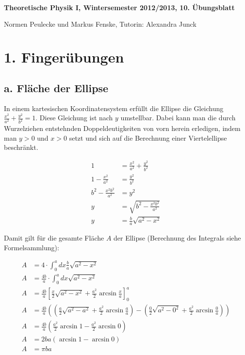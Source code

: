 \documentclass[a4paper,german,12pt,smallheadings]{scrartcl}
\begin{document}
\begin{center}
\bfseries %
\sffamily %
\vspace{-40pt}
Theoretische Physik I, Wintersemester 2012/2013, 10. Übungsblatt

Normen Peulecke und Markus Fenske, Tutorin: Alexandra Junck
\vspace{-10pt}
\end{center}


\section*{1. Fingerübungen}
\subsection*{a. Fläche der Ellipse}

In einem kartesischen Koordinatensystem erfüllt die Ellipse die Gleichung
$\frac{x^2}{a^2} + \frac{y^2}{b^2} = 1$. Diese Gleichung ist nach $y$
umstellbar. Dabei kann man die durch Wurzelziehen entstehnden
Doppeldeutigkeiten von vorn herein erledigen, indem man $y > 0$ und $x > 0$
setzt und sich auf die Berechnung einer Viertelellipse beschränkt.

\begin{align*}
  1 &= \frac{x^2}{a^2} + \frac{y^2}{b^2}\\
  1 - \frac{x^2}{a^2} &= \frac{y^2}{b^2}\\
  b^2 - \frac{x^2b^2}{a^2} &= y^2\\
  y &= \sqrt{b^2 - \frac{x^2b^2}{a^2}} \\
  y &= \frac{b}{a} \sqrt{a^2 - x^2}
\end{align*}

Damit gilt für die gesamte Fläche $A$ der Ellipse (Berechnung des Integrals siehe Formelsammlung):

\begin{align*}
  A &= 4 \cdot \int_0^a dx \frac{b}{a} \sqrt{a^2 - x^2} \\
  A &= \frac{4b}{a} \cdot \int_0^a dx \sqrt{a^2 - x^2} \\
  A &= \frac{4b}{a} \left[ \frac{x}{2} \sqrt{a^2 - x^2} + \frac{a^2}{2} \arcsin \frac{x}{a} \right]_0^a \\
  A &= \frac{4b}{a} \left( \left(\frac{a}{2} \sqrt{a^2 - a^2} + \frac{a^2}{2} \arcsin \frac{a}{a} \right) -
    \left( \frac{0}{2} \sqrt{a^2 - 0^2} + \frac{a^2}{2} \arcsin \frac{0}{a} \right) \right) \\
  A &= \frac{4b}{a} \left( \frac{a^2}{2} \arcsin 1 - \frac{a^2}{2} \arcsin 0 \right) \\
  A &= 2ba \left( \arcsin 1 - \arcsin 0 \right) \\
  A &= \pi ba
\end{align*}
\end{document}
